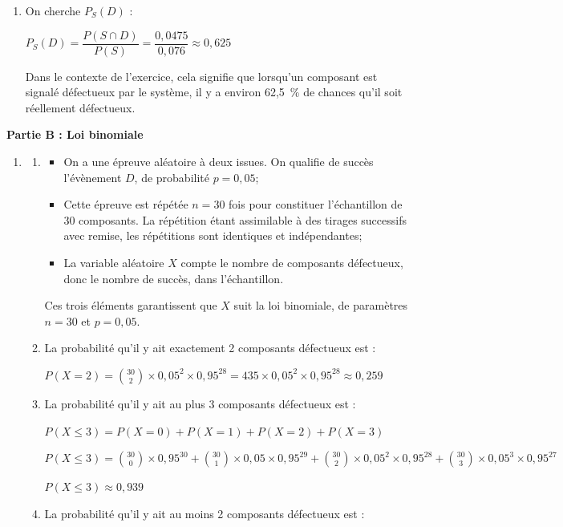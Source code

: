 \documentclass[TC, exos, e,p]{phBook}
\begin{document}
\begin{exercice}
\begin{correction}
\begin{enumerate}
\item On cherche $P_S(D)$ :

$P_S(D) = \dfrac{P(S \cap D)}{P(S)} = \dfrac{0,0475}{0,076} \approx 0,625$

Dans le contexte de l'exercice, cela signifie que lorsqu'un composant est signalé défectueux par le système, il y a environ 62,5~\% de chances qu'il soit réellement défectueux.
\end{enumerate}

\bigskip

\textbf{Partie B : Loi binomiale}

\begin{enumerate}[resume]
\item
	\begin{enumerate}
		\item 
\begin{itemize}
\item On a une épreuve aléatoire à deux issues. On qualifie de succès l'évènement $D$, de probabilité $p = 0,05$;
\item Cette épreuve est répétée $n =30$ fois pour constituer l'échantillon de 30 composants. La répétition étant assimilable à des tirages successifs avec remise, les répétitions sont identiques et indépendantes;
\item La variable aléatoire $X$ compte le nombre de composants défectueux, donc le nombre de succès, dans l'échantillon.
\end{itemize}

Ces trois éléments garantissent que $X$ suit la loi binomiale, de paramètres $n = 30$ et $p = 0,05$.

		\item La probabilité qu'il y ait exactement 2 composants défectueux est :

$P(X = 2) = \displaystyle \binom{30}{2}\times 0,05^2 \times 0,95^{28} = 435 \times 0,05^2 \times 0,95^{28} \approx 0,259$

		\item La probabilité qu'il y ait au plus 3 composants défectueux est :

$P(X \le 3) = P(X = 0) + P(X = 1) + P(X = 2) + P(X = 3)$

$P(X \le 3) = \displaystyle \binom{30}{0}\times 0,95^{30} + \binom{30}{1}\times 0,05 \times 0,95^{29} + \binom{30}{2}\times 0,05^2 \times 0,95^{28} + \binom{30}{3}\times 0,05^3 \times 0,95^{27}$

$P(X \le 3) \approx 0,939$

		\item La probabilité qu'il y ait au moins 2 composants défectueux est :


\end{enumerate}
\end{enumerate}
\end{correction}
\end{exercice}
\end{document}
